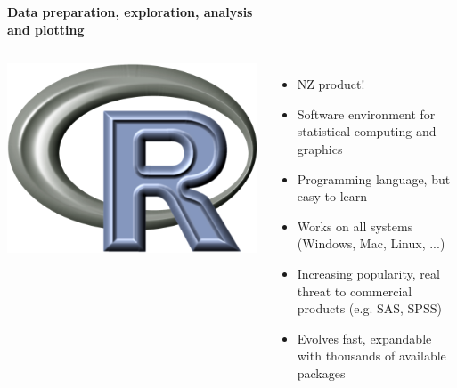 \documentclass[9pt,xcolor=pdftex,dvipsnames,table]{beamer}
\begin{document}
\begin{frame}{\textbf{Data preparation, exploration, analysis \\ and plotting}}
\begin{columns}
\centering
\includegraphics[width=1\textwidth]{images/r-logo.png}
\begin{itemize}
\item NZ product!
\item Software environment for statistical computing and graphics
\item Programming language, but easy to learn
\item Works on all systems (Windows, Mac, Linux, ...)
\item Increasing popularity, real threat to commercial products
  (e.g. SAS, SPSS)
\item Evolves fast, expandable with thousands of available packages
\end{itemize}
\end{columns}
\end{frame}
\end{document}
